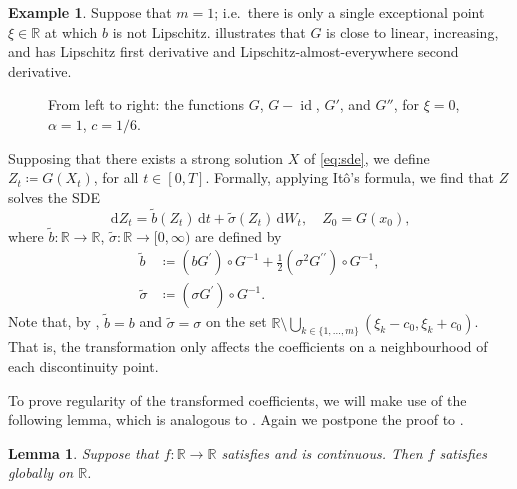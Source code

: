 \documentclass[onseside, final]{amsart}
\newtheorem{lemma}[theorem]{Lemma}
\theoremstyle{definition}
\newtheorem{example}[theorem]{Example}
\newcommand{\R}{\mathbb R}
\newcommand{\D}{\,\mathrm{d}}
\newcommand{\continuityset}{\R \setminus \bigcup_{k \in \{1, \dotsc, m\}}(\xi_k - c_0, \xi_k + c_0)}
\numberwithin{equation}{section}
\begin{document}
		\begin{example}\label{ex:single-discontinuity}
			Suppose that $m = 1$; i.e.~there is only a single exceptional point $\xi \in \R$ at which $b$ is not Lipschitz.
			 illustrates that $G$ is close to linear, increasing, and has Lipschitz first derivative and Lipschitz-almost-everywhere second derivative.
			\begin{figure}[h]
				\centering
				
				
				
								\caption{From left to right: the functions $G$, $G-\operatorname{id}$, $G'$, and $G''$, for $\xi = 0$, $\alpha = 1$, $c = 1/6$.}
				\label{fig:G}
			\end{figure}
		\end{example}
		
		Supposing that there exists a strong solution $X$ of \eqref{eq:sde}, we define $Z_t \coloneqq G(X_t)$, for all $t \in [0, T]$. Formally, applying It\^o's formula, we find that $Z$ solves the SDE
		\begin{equation}\label{eq:sde-z}
			\D Z_t = \tilde b(Z_t) \D t + \tilde \sigma(Z_t) \D W_t, \quad Z_0 = G(x_0),
		\end{equation}
		where $\tilde b \colon \R \to \R$, $\tilde \sigma \colon \R \to [0, \infty)$ are defined by
		\begin{equation}\label{eq:transformed-coefficients}
			\begin{split}
				\tilde b & \coloneqq (b G^\prime) \circ G^{-1} + \frac12 (\sigma^2 G^{\prime \prime})\circ G^{-1},\\
				\tilde \sigma & \coloneqq (\sigma G^{\prime}) \circ G^{-1}.
			\end{split}
		\end{equation}
		Note that, by , $\tilde b = b$ and $\tilde \sigma = \sigma$ on the set $\continuityset$. That is, the transformation only affects the coefficients on a neighbourhood of each discontinuity point.
		
		To prove regularity of the transformed coefficients, we will make use of the following lemma, which is analogous to \cite[Lemma 2.6]{LeSz16}. Again we postpone the proof to .
		
		\begin{lemma}\label{lem:piecewise-plus-continuity}
			Suppose that $f \colon \R \to \R$ satisfies  and is continuous. Then $f$ satisfies  globally on $\R$.
		\end{lemma}
		
\end{document}
